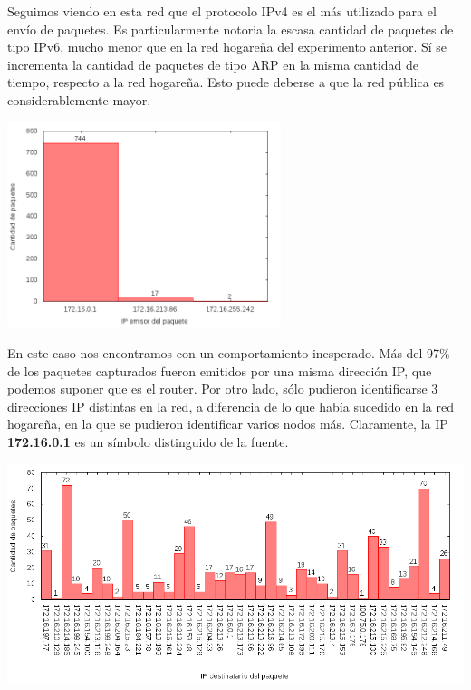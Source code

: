 Seguimos viendo en esta red que el protocolo IPv4 es el más utilizado para el envío de paquetes. Es particularmente notoria la escasa
cantidad de paquetes de tipo IPv6, mucho menor que en la red hogareña del experimento anterior. Sí se incrementa la cantidad de paquetes
de tipo ARP en la misma cantidad de tiempo, respecto a la red hogareña. Esto puede deberse a que la red pública es considerablemente mayor.

\begin{center}
\includegraphics[width=8cm]{../mediciones/altop-wifi-10/altop10IpsSrcArp.png}
\end{center}

En este caso nos encontramos con un comportamiento inesperado. Más del 97\% de los paquetes capturados fueron emitidos por una misma dirección
IP, que podemos suponer que es el router. Por otro lado, sólo pudieron identificarse 3 direcciones IP distintas en la red, a diferencia de lo
que había sucedido en la red hogareña, en la que se pudieron identificar varios nodos más. Claramente, la IP \textbf{172.16.0.1} es un símbolo
distinguido de la fuente.

\begin{center}
\includegraphics[width=16cm]{../mediciones/altop-wifi-10/altop10IpsDstArp.png}
\end{center}

